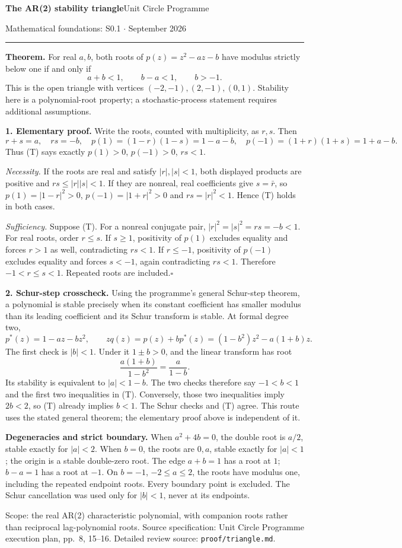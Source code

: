 \documentclass[10pt,a4paper]{article}
\begin{document}
{\Large\bfseries The AR(2) stability triangle}\hfill{\small Unit Circle Programme}

{\small Mathematical foundations: S0.1 \quad $\cdot$  September 2026}
\vspace{4pt}\hrule\vspace{6pt}

\textbf{Theorem.} For real $a,b$, both roots of $p(z)=z^2-az-b$ have modulus strictly below one if and only if
\[
\boxed{a+b<1,\qquad b-a<1,\qquad b>-1.}\tag{T}
\]
This is the open triangle with vertices $(-2,-1),(2,-1),(0,1)$. Stability here is a polynomial-root property; a stochastic-process statement requires additional assumptions.

\textbf{1. Elementary proof.} Write the roots, counted with multiplicity, as $r,s$. Then
\[
r+s=a,\quad rs=-b,\quad p(1)=(1-r)(1-s)=1-a-b,
\quad p(-1)=(1+r)(1+s)=1+a-b.
\]
Thus (T) says exactly $p(1)>0$, $p(-1)>0$, $rs<1$.

\emph{Necessity.} If the roots are real and satisfy $|r|,|s|<1$, both displayed products are positive and $rs\leq |r||s|<1$. If they are nonreal, real coefficients give $s=\bar r$, so $p(1)=|1-r|^2>0$, $p(-1)=|1+r|^2>0$ and $rs=|r|^2<1$. Hence (T) holds in both cases.

\emph{Sufficiency.} Suppose (T). For a nonreal conjugate pair, $|r|^2=|s|^2=rs=-b<1$. For real roots, order $r\leq s$. If $s\geq1$, positivity of $p(1)$ excludes equality and forces $r>1$ as well, contradicting $rs<1$. If $r\leq-1$, positivity of $p(-1)$ excludes equality and forces $s<-1$, again contradicting $rs<1$. Therefore $-1<r\leq s<1$. Repeated roots are included.\hfill$\square$

\textbf{2. Schur-step crosscheck.} Using the programme's general Schur-step theorem, a polynomial is stable precisely when its constant coefficient has smaller modulus than its leading coefficient and its Schur transform is stable. At formal degree two,
\[
p^*(z)=1-az-bz^2,\qquad zq(z)=p(z)+bp^*(z)
 =(1-b^2)z^2-a(1+b)z.
\]
The first check is $|b|<1$. Under it $1\pm b>0$, and the linear transform has root
\[
\frac{a(1+b)}{1-b^2}=\frac{a}{1-b}.
\]
Its stability is equivalent to $|a|<1-b$. The two checks therefore say $-1<b<1$ and the first two inequalities in (T). Conversely, those two inequalities imply $2b<2$, so (T) already implies $b<1$. The Schur checks and (T) agree. This route uses the stated general theorem; the elementary proof above is independent of it.

\textbf{Degeneracies and strict boundary.} When $a^2+4b=0$, the double root is $a/2$, stable exactly for $|a|<2$. When $b=0$, the roots are $0,a$, stable exactly for $|a|<1$; the origin is a stable double-zero root. The edge $a+b=1$ has a root at $1$; $b-a=1$ has a root at $-1$. On $b=-1$, $-2\leq a\leq2$, the roots have modulus one, including the repeated endpoint roots. Every boundary point is excluded. The Schur cancellation was used only for $|b|<1$, never at its endpoints.

\vfill
{\footnotesize Scope: the real AR(2) characteristic polynomial, with companion roots rather than reciprocal lag-polynomial roots. Source specification: Unit Circle Programme execution plan, pp.\ 8, 15--16. Detailed review source: \texttt{proof/triangle.md}.}
\end{document}
